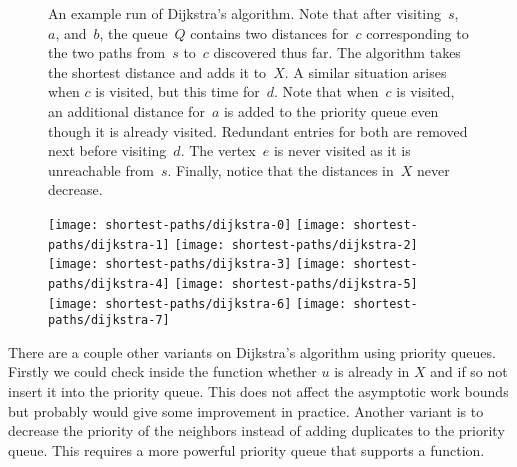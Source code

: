 \begin{comment}
\begin{remark}
As with the BFS algorithm, we can think of Dijkstra's algorithm as
flooding the graph from the source. The only difference is that we
have to think of the weights as the time for the water to traverse a
pipe (edge).  
\end{remark}
\end{comment}

\begin{figure}
\begin{example}
An example run of Dijkstra's algorithm. Note that after
visiting~$s$,~$a$, and~$b$, the queue~$Q$ contains two distances
for~$c$ corresponding to the two paths from~$s$ to~$c$ discovered thus
far.  The algorithm takes the shortest distance and adds it to~$X$.  A
similar situation arises when $c$ is visited, but this time
for~$d$. Note that when~$c$ is visited, an additional distance for~$a$
is added to the priority queue even though it is already visited.
Redundant entries for both are removed next before visiting~$d$.  The
vertex~$e$ is never visited as it is unreachable from~$s$.  Finally,
notice that the distances in~$X$ never decrease.


\begin{center}
\texttt{[image: shortest-paths/dijkstra-0]} 
\hfill
\texttt{[image: shortest-paths/dijkstra-1]}
\vspace{5ex}
\texttt{[image: shortest-paths/dijkstra-2]}
\hfill
\texttt{[image: shortest-paths/dijkstra-3]}
\vspace{5ex}
\texttt{[image: shortest-paths/dijkstra-4]}
\hfill 
\texttt{[image: shortest-paths/dijkstra-5]}
\vspace{5ex}
\texttt{[image: shortest-paths/dijkstra-6]}
\hfill
\texttt{[image: shortest-paths/dijkstra-7]}
\end{center}
\end{example}
\end{figure}

There are a couple other variants on Dijkstra's algorithm using
priority queues. 
%
Firstly we could check inside the  function whether $u$
is already in $X$ and if so not insert it into the priority queue.
%
This does not affect the asymptotic work bounds but probably would
give some improvement in practice.  
%
Another variant is to decrease the priority of the neighbors instead
of adding duplicates to the priority queue.  This requires a more
powerful priority queue that supports a  function.


